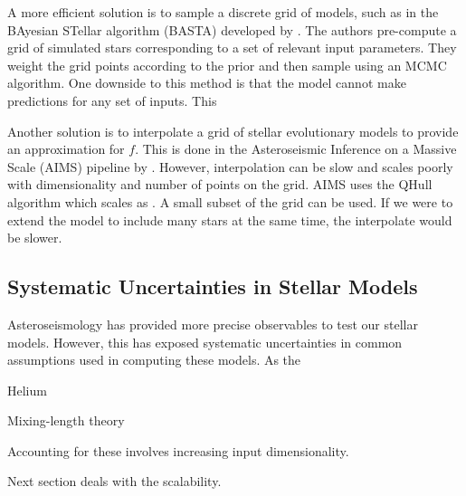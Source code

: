 A more efficient solution is to sample a discrete grid of models, such as in the BAyesian STellar algorithm (BASTA) developed by \citet{AguirreBorsen-Koch.Rorsted.ea2022}. The authors pre-compute a grid of simulated stars corresponding to a set of relevant input parameters. They weight the grid points according to the prior and then sample using an MCMC algorithm. One downside to this method is that the model cannot make predictions for any set of inputs. This 

Another solution is to interpolate a grid of stellar evolutionary models to provide an approximation for \(f\). This is done in the Asteroseismic Inference on a Massive Scale (AIMS) pipeline by \citet{Rendle.Buldgen.ea2019}. However, interpolation can be slow and scales poorly with dimensionality and number of points on the grid. AIMS uses the QHull algorithm which scales as . A small subset of the grid can be used. If we were to extend the model to include many stars at the same time, the interpolate would be slower.

\subsection{Systematic Uncertainties in Stellar Models}

Asteroseismology has provided more precise observables to test our stellar models. However, this has exposed systematic uncertainties in common assumptions used in computing these models. As the 

Helium

Mixing-length theory


Accounting for these involves increasing input dimensionality.

Next section deals with the scalability.


